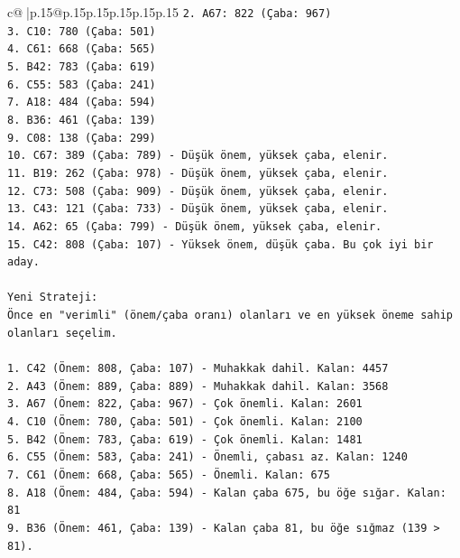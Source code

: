 \documentclass{article}
\begin{document}
{\begin{supertabular}{c@{$\;$}|p{.15\linewidth}@{}p{.15\linewidth}p{.15\linewidth}p{.15\linewidth}p{.15\linewidth}p{.15\linewidth}}
{{{\texttt{2. A67: 822 (Çaba: 967)} \\
\texttt{3. C10: 780 (Çaba: 501)} \\
\texttt{4. C61: 668 (Çaba: 565)} \\
\texttt{5. B42: 783 (Çaba: 619)} \\
\texttt{6. C55: 583 (Çaba: 241)} \\
\texttt{7. A18: 484 (Çaba: 594)} \\
\texttt{8. B36: 461 (Çaba: 139)} \\
\texttt{9. C08: 138 (Çaba: 299)} \\
\texttt{10. C67: 389 (Çaba: 789) {-} Düşük önem, yüksek çaba, elenir.} \\
\texttt{11. B19: 262 (Çaba: 978) {-} Düşük önem, yüksek çaba, elenir.} \\
\texttt{12. C73: 508 (Çaba: 909) {-} Düşük önem, yüksek çaba, elenir.} \\
\texttt{13. C43: 121 (Çaba: 733) {-} Düşük önem, yüksek çaba, elenir.} \\
\texttt{14. A62: 65 (Çaba: 799) {-} Düşük önem, yüksek çaba, elenir.} \\
\texttt{15. C42: 808 (Çaba: 107) {-} Yüksek önem, düşük çaba. Bu çok iyi bir aday.} \\
\\ 
\texttt{Yeni Strateji:} \\
\texttt{Önce en "verimli" (önem/çaba oranı) olanları ve en yüksek öneme sahip olanları seçelim.} \\
\\ 
\texttt{1. C42 (Önem: 808, Çaba: 107) {-} Muhakkak dahil. Kalan: 4457} \\
\texttt{2. A43 (Önem: 889, Çaba: 889) {-} Muhakkak dahil. Kalan: 3568} \\
\texttt{3. A67 (Önem: 822, Çaba: 967) {-} Çok önemli. Kalan: 2601} \\
\texttt{4. C10 (Önem: 780, Çaba: 501) {-} Çok önemli. Kalan: 2100} \\
\texttt{5. B42 (Önem: 783, Çaba: 619) {-} Çok önemli. Kalan: 1481} \\
\texttt{6. C55 (Önem: 583, Çaba: 241) {-} Önemli, çabası az. Kalan: 1240} \\
\texttt{7. C61 (Önem: 668, Çaba: 565) {-} Önemli. Kalan: 675} \\
\texttt{8. A18 (Önem: 484, Çaba: 594) {-} Kalan çaba 675, bu öğe sığar. Kalan: 81} \\
\texttt{9. B36 (Önem: 461, Çaba: 139) {-} Kalan çaba 81, bu öğe sığmaz (139 > 81).} \\
}}}
\end{supertabular}}
\end{document}

